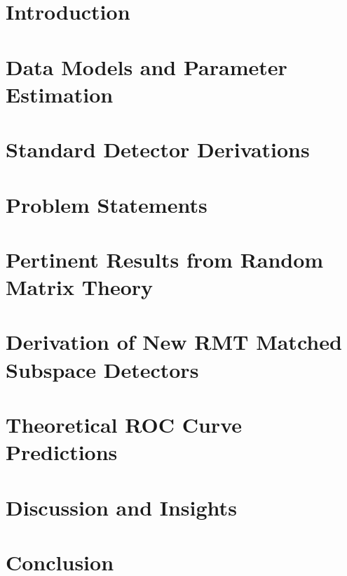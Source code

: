 

\section{Introduction}\label{sec:ieee_msd_intro}


\section{Data Models and Parameter Estimation}\label{sec:ieee_msd_data_models}


\section{Standard Detector Derivations}\label{sec:ieee_msd_std_detecs}


\section{Problem Statements}\label{sec:ieee_msd_prob_state}


\section{Pertinent Results from Random Matrix Theory}\label{sec:ieee_msd_rmt}


\section{Derivation of New RMT Matched Subspace Detectors}\label{sec:ieee_msd_rmt_detecs}


\section{Theoretical ROC Curve Predictions}\label{sec:ieee_msd_roc_theory}


\section{Discussion and Insights}\label{sec:ieee_msd_results}


\section{Conclusion}\label{sec:ieee_msd_conclusion}


%
